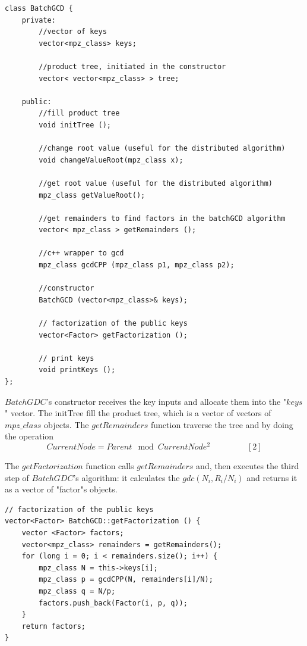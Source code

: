 \documentclass[a4paper,12pt]{article}
\begin{document}
\lstset{language=C++}        
\begin{lstlisting}[frame=single]
class BatchGCD {
    private:
        //vector of keys
        vector<mpz_class> keys;

        //product tree, initiated in the constructor
        vector< vector<mpz_class> > tree;

    public:
        //fill product tree
        void initTree ();

        //change root value (useful for the distributed algorithm)
        void changeValueRoot(mpz_class x);

        //get root value (useful for the distributed algorithm)
        mpz_class getValueRoot();

        //get remainders to find factors in the batchGCD algorithm
        vector< mpz_class > getRemainders ();

        //c++ wrapper to gcd
        mpz_class gcdCPP (mpz_class p1, mpz_class p2);

        //constructor
        BatchGCD (vector<mpz_class>& keys);

        // factorization of the public keys
        vector<Factor> getFactorization ();

        // print keys
        void printKeys ();
};
\end{lstlisting}


$BatchGDC$'s constructor receives the key inputs and allocate them into the "$keys$" vector. The initTree fill the product tree, which is a vector of vectors of $mpz\_class$ objects.  The $getRemainders$ function traverse the tree and by doing the operation 
$$Current Node = Parent \mod Current Node^2~~~~~~~~~~~~~~~~~~~~[2]$$ 

The $getFactorization$ function calls $getRemainders$ and, then executes the third step of $Batch GDC$'s algorithm: it calculates the $gdc(N_i,R_i/N_i)$ and returns it as a vector of "factor"s objects.

\lstset{language=C++}        
\begin{lstlisting}[frame=single] 
// factorization of the public keys
vector<Factor> BatchGCD::getFactorization () {
    vector <Factor> factors;
    vector<mpz_class> remainders = getRemainders();
    for (long i = 0; i < remainders.size(); i++) {
        mpz_class N = this->keys[i];
        mpz_class p = gcdCPP(N, remainders[i]/N);
        mpz_class q = N/p;
        factors.push_back(Factor(i, p, q));
    }
    return factors;
}

\end{lstlisting}
\end{document}
